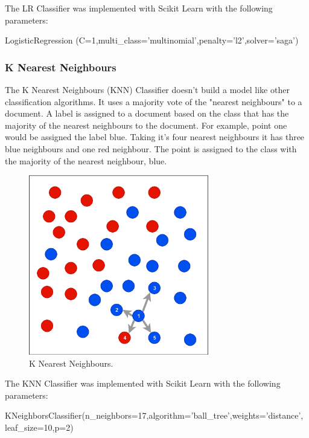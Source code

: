 The LR Classifier was implemented with Scikit Learn with the following parameters:

\begin{tcolorbox}
\begin{center}
	LogisticRegression (C=1,multi\_class='multinomial',penalty='l2',solver='saga')
\end{center}
\end{tcolorbox}

\subsubsection*{K Nearest Neighbours}

The K Nearest Neighbours (KNN) Classifier doesn't build a model like other classification algorithms. It uses a majority vote of the "nearest neighbours" to a document. A label is assigned to a document based on the class that has the majority of the nearest neighbours to the document. For example, point one would be assigned the label blue. Taking it's four nearest neighbours it has three blue neighbours and one red neighbour. The point is assigned to the class with the majority of the nearest neighbour, blue.

\begin{figure}[h!]
\centering
\includegraphics[width=0.7\textwidth]{design_and_methodology/knn.png}
\caption{\label{fig:knn} K Nearest Neighbours.}
\end{figure}

The KNN Classifier was implemented with Scikit Learn with the following parameters:

\begin{tcolorbox}
\begin{center}
	KNeighborsClassifier(n\_neighbors=17,algorithm='ball\_tree',weights='distance',
	leaf\_size=10,p=2)
\end{center}
\end{tcolorbox}

